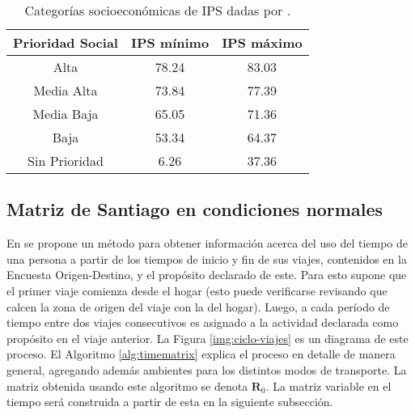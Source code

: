 \begin{table}[h!]
\centering
\begin{tabular}{|c c c |} 
 \hline
 \textbf{Prioridad Social} & \textbf{IPS mínimo} & \textbf{IPS máximo} \\ [0.5ex] 
 \hline
 Alta & 78.24 & 83.03 \\ 
 Media Alta & 73.84 & 77.39\\
 Media Baja & 65.05 & 71.36 \\
 Baja & 53.34 & 64.37\\
 Sin Prioridad & 6.26 & 37.36 \\ [1ex] 
 \hline
\end{tabular}
\caption{Categorías socioeconómicas de IPS dadas por \cite{SEREMIRM2019}.}
\label{table:ips-categ}
\end{table}

\subsection{Matriz de Santiago en condiciones normales} 

En \cite{Munizaga2011} se propone un método para obtener información acerca del uso del tiempo de una persona a partir de los tiempos de inicio y fin de sus viajes, contenidos en la Encuesta Origen-Destino, y el propósito declarado de este. Para esto supone que el primer viaje comienza desde el hogar (esto puede verificarse revisando que calcen la zona de origen del viaje con la del hogar). Luego, a cada período de tiempo entre dos viajes consecutivos es asignado a la actividad declarada como propósito en el viaje anterior. La Figura \ref{img:ciclo-viajes} es un diagrama de este proceso. El Algoritmo \ref{alg:timematrix} explica el proceso en detalle de manera general, agregando además ambientes para los distintos modos de transporte. La matriz obtenida usando este algoritmo se denota \(\mathbf{R}_0\). La matriz variable en el tiempo será construida a partir de esta en la siguiente subsección.



